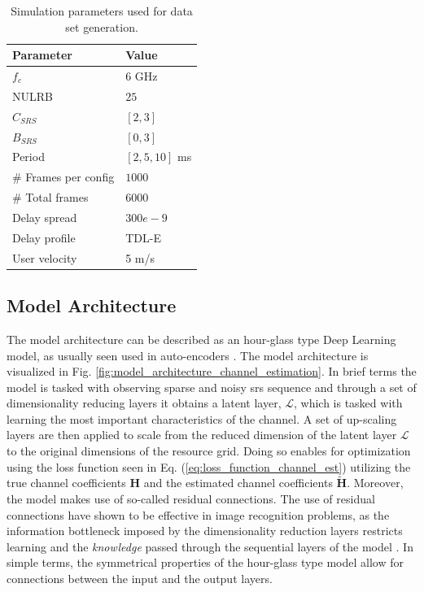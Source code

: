 \begin{table}[]
\centering
\begin{tabular}{l|l}
\toprule
\textbf{Parameter}                 & \textbf{Value} \\ \midrule
$f_c$ & $6$ GHz \\
NULRB         & $25$             \\
$C_{SRS}$   &  $[2,3]$               \\
$B_{SRS}$ & $[0,3]$ \\
Period & $[2, 5, 10]$ ms \\
\# Frames per config & $1000$ \\
\# Total frames & $6000$ \\
Delay spread  & $300e-9$         \\
Delay profile & TDL-E          \\
User velocity & 5 m/s         
\end{tabular}
\vspace{1em}
\caption{Simulation parameters used for data set generation.}
\label{tab:sim_param_channel_est}
\end{table}

\subsection{Model Architecture}
The model architecture can be described as an hour-glass type Deep Learning model, as usually seen used in auto-encoders \cite{Nielsen2015}. The model architecture is visualized in Fig. \ref{fig:model_architecture_channel_estimation}. In brief terms the model is tasked with observing sparse and noisy \gls{srs} sequence and through a set of dimensionality reducing layers it obtains a latent layer, $\mathcal{L}$, which is tasked with learning the most important characteristics of the channel. A set of up-scaling layers are then applied to scale from the reduced dimension of the latent layer $\mathcal{L}$ to the original dimensions of the resource grid. Doing so enables for optimization using the loss function seen in Eq. (\ref{eq:loss_function_channel_est}) utilizing the true channel coefficients $\mathbf{H}$ and the estimated channel coefficients $\mathbf{\widetilde{H}}$. Moreover, the model makes use of so-called residual connections. The use of residual connections have shown to be effective in image recognition problems, as the information bottleneck imposed by the dimensionality reduction layers restricts learning and the \emph{knowledge} passed through the sequential layers of the model \cite{He2016DeepRecognition}. In simple terms, the symmetrical properties of the hour-glass type model allow for connections between the input and the output layers. 

